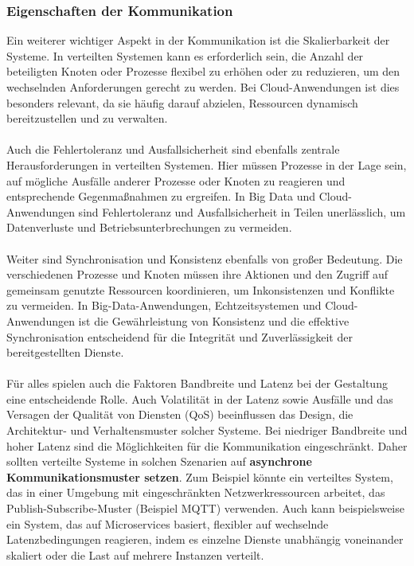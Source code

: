 \subsubsection{Eigenschaften der Kommunikation}
Ein weiterer wichtiger Aspekt in der Kommunikation ist die Skalierbarkeit der Systeme. In verteilten Systemen kann es erforderlich sein, die Anzahl der beteiligten Knoten oder Prozesse flexibel zu erhöhen oder zu reduzieren, um den wechselnden Anforderungen gerecht zu werden. Bei Cloud-Anwendungen ist dies besonders relevant, da sie häufig darauf abzielen, Ressourcen dynamisch bereitzustellen und zu verwalten.
\\\\
Auch die Fehlertoleranz und Ausfallsicherheit sind ebenfalls zentrale Herausforderungen in verteilten Systemen. Hier müssen Prozesse in der Lage sein, auf mögliche Ausfälle anderer Prozesse oder Knoten zu reagieren und entsprechende Gegenmaßnahmen zu ergreifen. In Big Data und Cloud-Anwendungen sind Fehlertoleranz und Ausfallsicherheit in Teilen unerlässlich, um Datenverluste und Betriebsunterbrechungen zu vermeiden.
\\\\
Weiter sind Synchronisation und Konsistenz ebenfalls von großer Bedeutung. Die verschiedenen Prozesse und Knoten müssen ihre Aktionen und den Zugriff auf gemeinsam genutzte Ressourcen koordinieren, um Inkonsistenzen und Konflikte zu vermeiden. In Big-Data-Anwendungen, Echtzeitsystemen und Cloud-Anwendungen ist die Gewährleistung von Konsistenz und die effektive Synchronisation entscheidend für die Integrität und Zuverlässigkeit der bereitgestellten Dienste.
\\\\
Für alles spielen auch die Faktoren Bandbreite und Latenz bei der Gestaltung eine entscheidende Rolle. Auch Volatilität in der Latenz sowie Ausfälle und das Versagen der Qualität von Diensten (QoS) beeinflussen das Design, die Architektur- und Verhaltensmuster solcher Systeme. Bei niedriger Bandbreite und hoher Latenz sind die Möglichkeiten für die Kommunikation eingeschränkt. Daher sollten verteilte Systeme in solchen Szenarien auf \textbf{asynchrone Kommunikationsmuster setzen}. Zum Beispiel könnte ein verteiltes System, das in einer Umgebung mit eingeschränkten Netzwerkressourcen arbeitet, das Publish-Subscribe-Muster (Beispiel MQTT) verwenden. Auch kann beispielsweise ein System, das auf Microservices basiert, flexibler auf wechselnde Latenzbedingungen reagieren, indem es einzelne Dienste unabhängig voneinander skaliert oder die Last auf mehrere Instanzen verteilt.
